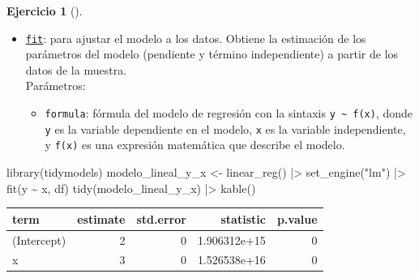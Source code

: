 \documentclass[
  a4paper,
]{scrreport}
\newenvironment{Shaded}{\begin{snugshade}}{\end{snugshade}}
\newcommand{\FunctionTok}[1]{\textcolor[rgb]{0.28,0.35,0.67}{#1}}
\newcommand{\NormalTok}[1]{\textcolor[rgb]{0.00,0.23,0.31}{#1}}
\newcommand{\OtherTok}[1]{\textcolor[rgb]{0.00,0.23,0.31}{#1}}
\newcommand{\SpecialCharTok}[1]{\textcolor[rgb]{0.37,0.37,0.37}{#1}}
\newcommand{\StringTok}[1]{\textcolor[rgb]{0.13,0.47,0.30}{#1}}
\providecommand{\tightlist}{%
  \setlength{\itemsep}{0pt}\setlength{\parskip}{0pt}}\usepackage{longtable,booktabs,array}
\theoremstyle{definition}
\newtheorem{exercise}{Ejercicio}[chapter]
\theoremstyle{remark}
\begin{document}
\begin{exercise}[]
\begin{enumerate}
\begin{tcolorbox}
\begin{itemize}
    \begin{itemize}
    \tightlist
    \item
      \texttt{motor}: motor de ajuste del modelo. En este caso se
      utiliza el motor \texttt{lm} que es el motor de ajuste de modelos
      lineales del paquete \texttt{stats}.
    \end{itemize}
  \item
    \href{https://www.tidymodels.org/find/fit/}{\texttt{fit}}: para
    ajustar el modelo a los datos. Obtiene la estimación de los
    parámetros del modelo (pendiente y término independiente) a partir
    de los datos de la muestra.\\
    Parámetros:

    \begin{itemize}
    \tightlist
    \item
      \texttt{formula}: fórmula del modelo de regresión con la sintaxis
      \texttt{y\ \textasciitilde{}\ f(x)}, donde \texttt{y} es la
      variable dependiente en el modelo, \texttt{x} es la variable
      independiente, y \texttt{f(x)} es una expresión matemática que
      describe el modelo.
    \end{itemize}
  \end{itemize}

\begin{Shaded}
\begin{Highlighting}[]
\FunctionTok{library}\NormalTok{(tidymodels)}
\NormalTok{modelo\_lineal\_y\_x }\OtherTok{\textless{}{-}} \FunctionTok{linear\_reg}\NormalTok{() }\SpecialCharTok{|\textgreater{}}
  \FunctionTok{set\_engine}\NormalTok{(}\StringTok{"lm"}\NormalTok{) }\SpecialCharTok{|\textgreater{}} 
  \FunctionTok{fit}\NormalTok{(y }\SpecialCharTok{\textasciitilde{}}\NormalTok{ x, df)}
\FunctionTok{tidy}\NormalTok{(modelo\_lineal\_y\_x) }\SpecialCharTok{|\textgreater{}} \FunctionTok{kable}\NormalTok{()}
\end{Highlighting}
\end{Shaded}

  \begin{longtable}[]{@{}lrrrr@{}}
  \toprule\noalign{}
  term & estimate & std.error & statistic & p.value \\
  \midrule\noalign{}
  \endhead
  \bottomrule\noalign{}
  \endlastfoot
  (Intercept) & 2 & 0 & 1.906312e+15 & 0 \\
  x & 3 & 0 & 1.526538e+16 & 0 \\
  \end{longtable}


\end{tcolorbox}
\end{enumerate}
\end{exercise}
\end{document}
